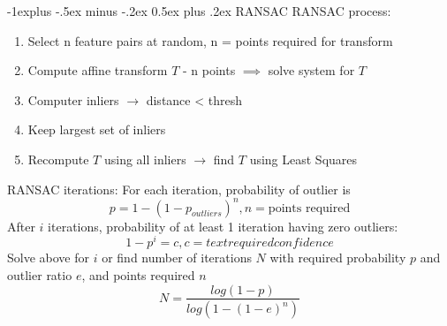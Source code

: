 \documentclass[10pt,landscape]{article}
\makeatletter
\renewcommand{\subsection}{\@startsection{subsection}{2}{0mm}%
                                {-1explus -.5ex minus -.2ex}%
                                {0.5ex plus .2ex}%
                                {\normalfont\normalsize\bfseries}}
\makeatother
\begin{document}
\begin{multicols}{3}
\subsection{RANSAC}
RANSAC process: 
\begin{enumerate}
        \item Select n feature pairs at random, n = points required for transform
        \item Compute affine transform $T$ - n points $\implies$ solve system for $T$ 
        \item Computer inliers $\rightarrow$ distance < thresh
        \item Keep largest set of inliers
        \item Recompute $T$ using all inliers $\rightarrow$ find $T$ using Least Squares
\end{enumerate}
RANSAC iterations:
For each iteration, probability of outlier is
\[
   p = 1 - (1 - p_{outliers})^n, n = \text{points required}   
\]
After $i$ iterations, probability of at least 1 iteration having zero outliers:
\[
   1 - p^i = c, c = text{required confidence}     
\]
Solve above for $i$ or find number of iterations $N$ with required probability $p$ and outlier ratio $e$, and points required $n$
\[
   N = \frac{log(1-p)}{log(1-(1-e)^n)}     
\]

\end{multicols}
\end{document}
